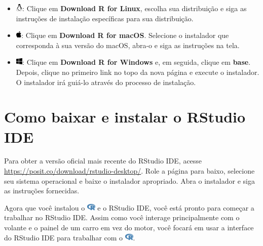 \documentclass[
  letterpaper,
]{book}
\theoremstyle{plain}
\theoremstyle{definition}
\theoremstyle{remark}
\begin{document}
\begin{itemize}
\item
  \includegraphics[width=0.88em,height=1em]{getting_started_with_r_files/figure-pdf/fa-icon-8b189a97593caea540dafe6d05793999.pdf}:
  Clique em \textbf{Download R for Linux}, escolha sua distribuição e
  siga as instruções de instalação específicas para sua distribuição.
\item
  \includegraphics[width=0.75em,height=1em]{getting_started_with_r_files/figure-pdf/fa-icon-934d7ce2d324ea402ee93b61438edad5.pdf}:
  Clique em \textbf{Download R for macOS}. Selecione o instalador que
  corresponda à sua versão do macOS, abra-o e siga as instruções na
  tela.
\item
  \includegraphics[width=0.88em,height=1em]{getting_started_with_r_files/figure-pdf/fa-icon-b8a547d429c8db6a447f95260c20adaf.pdf}:
  Clique em \textbf{Download R for Windows} e, em seguida, clique em
  \textbf{base}. Depois, clique no primeiro link no topo da nova página
  e execute o instalador. O instalador irá guiá-lo através do processo
  de instalação.
\end{itemize}

\section{Como baixar e instalar o RStudio
IDE}\label{como-baixar-e-instalar-o-rstudio-ide}

Para obter a versão oficial mais recente do RStudio IDE, acesse
\url{https://posit.co/download/rstudio-desktop/}. Role a página para
baixo, selecione seu sistema operacional e baixe o instalador
apropriado. Abra o instalador e siga as instruções fornecidas.

Agora que você instalou o
\includegraphics[width=1.13em,height=1em]{getting_started_with_r_files/figure-pdf/fa-icon-9b00320707d42527dde67262afb33ded.pdf}
e o RStudio IDE, você está pronto para começar a trabalhar no RStudio
IDE. Assim como você interage principalmente com o volante e o painel de
um carro em vez do motor, você focará em usar a interface do RStudio IDE
para trabalhar com o
\includegraphics[width=1.13em,height=1em]{getting_started_with_r_files/figure-pdf/fa-icon-9b00320707d42527dde67262afb33ded.pdf}.
\end{document}
